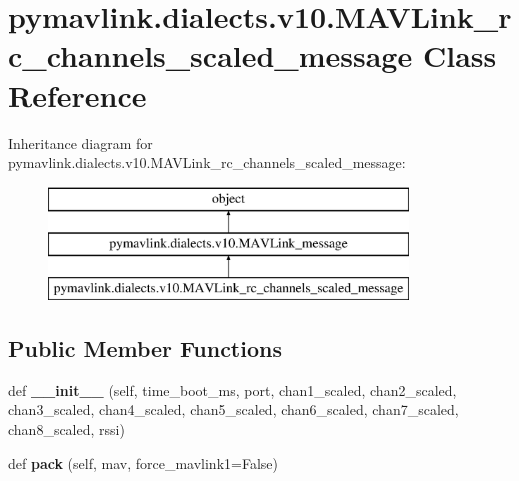 \hypertarget{classpymavlink_1_1dialects_1_1v10_1_1MAVLink__rc__channels__scaled__message}{}\section{pymavlink.\+dialects.\+v10.\+M\+A\+V\+Link\+\_\+rc\+\_\+channels\+\_\+scaled\+\_\+message Class Reference}
\label{classpymavlink_1_1dialects_1_1v10_1_1MAVLink__rc__channels__scaled__message}
Inheritance diagram for pymavlink.\+dialects.\+v10.\+M\+A\+V\+Link\+\_\+rc\+\_\+channels\+\_\+scaled\+\_\+message\+:\begin{figure}[H]
\begin{center}
\leavevmode
\includegraphics[height=3.000000cm]{classpymavlink_1_1dialects_1_1v10_1_1MAVLink__rc__channels__scaled__message}
\end{center}
\end{figure}
\subsection*{Public Member Functions}
\begin{DoxyCompactItemize}
\item 
\mbox{\label{classpymavlink_1_1dialects_1_1v10_1_1MAVLink__rc__channels__scaled__message_a380a6c3114e5d8b69db988e659ab6630}} 
def {\bfseries \+\_\+\+\_\+init\+\_\+\+\_\+} (self, time\+\_\+boot\+\_\+ms, port, chan1\+\_\+scaled, chan2\+\_\+scaled, chan3\+\_\+scaled, chan4\+\_\+scaled, chan5\+\_\+scaled, chan6\+\_\+scaled, chan7\+\_\+scaled, chan8\+\_\+scaled, rssi)
\item 
\mbox{\label{classpymavlink_1_1dialects_1_1v10_1_1MAVLink__rc__channels__scaled__message_a47fc0ee85ae0aa7049ee37ab57715b16}} 
def {\bfseries pack} (self, mav, force\+\_\+mavlink1=False)
\end{DoxyCompactItemize}

